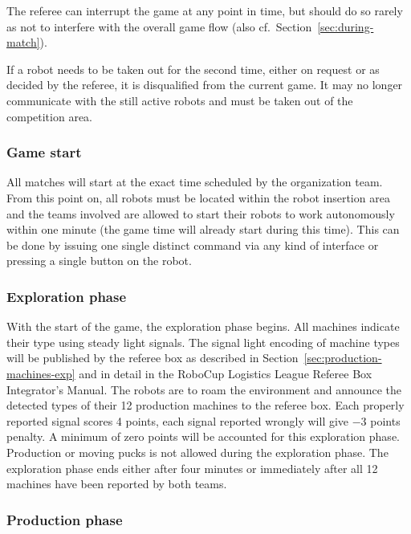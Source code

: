 \documentclass[12pt,twoside]{article}
\newcommand{\refsec}[1]{Section~\ref{#1}}
\begin{document}
The referee can interrupt the game at any point in time, but should do
so rarely as not to interfere with the overall game flow (also
cf.~\refsec{sec:during-match}).

If a robot needs to be taken out for the second time, either on
request or as decided by the referee, it is disqualified from the
current game. It may no longer communicate with the still active
robots and must be taken out of the competition area.

\subsubsection{Game start}
\label{sec:game-start}
%
All matches will start at the exact time scheduled by the organization
team. From this point on, all robots must be located within the robot
insertion area and the teams involved are allowed to start their
robots to work autonomously within one minute (the game time will
already start during this time). This can be done by issuing one
single distinct command via any kind of interface or pressing a single
button on the robot.

\subsubsection{Exploration phase}
\label{sec:expphase}
%
With the start of the game, the exploration phase begins. All machines
indicate their type using steady light signals. The signal light
encoding of machine types will be published by the referee box as
described in \refsec{sec:production-machines-exp} and in detail in the
RoboCup Logistics League Referee Box Integrator's Manual. The robots
are to roam the environment and announce the detected types of their
12 production machines to the referee box.  Each properly reported
signal scores \num{+4} points, each signal reported wrongly will give
\num{-3} points penalty. A minimum of zero points will be accounted
for this exploration phase. Production or moving pucks is not allowed
during the exploration phase.  The exploration phase ends either after
four minutes or immediately after all 12 machines have been reported
by both teams.



\subsubsection{Production phase}
\label{sec:production-phase}
\end{document}

